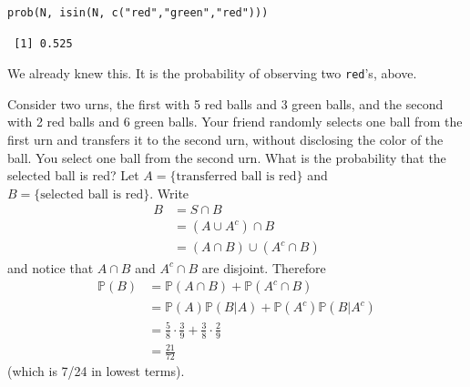 \documentclass[captions=tableheading]{scrbook}
\begin{document}
\lstset{language=R}
\begin{lstlisting}
prob(N, isin(N, c("red","green","red")))
\end{lstlisting}

\begin{verbatim}
 [1] 0.525
\end{verbatim}

We already knew this. It is the probability of observing two \texttt{red}'s, above.

\begin{example}
Consider two urns, the first with 5 red balls and 3 green balls, and the second with 2 red balls and 6 green balls. Your friend randomly selects one ball from the first urn and transfers it to the second urn, without disclosing the color of the ball. You select one ball from the second urn. What is the probability that the selected ball is red? Let \( A = \{ \mbox{transferred ball is red} \} \) and \( B = \{ \mbox{selected ball is red} \} \). Write
\begin{align*}
B & =S\cap B\\
 & =(A\cup A^{c})\cap B\\
 & =(A\cap B)\cup(A^{c}\cap B)
\end{align*}
and notice that \(A\cap B\) and \(A^{c}\cap B\) are disjoint. Therefore
\begin{align*}
\mathbb{P}(B) & =\mathbb{P}(A\cap B)+\mathbb{P}(A^{c}\cap B)\\
 & =\mathbb{P}(A)\mathbb{P}(B|A)+\mathbb{P}(A^{c})\mathbb{P}(B|A^{c})\\
 & =\frac{5}{8}\cdot\frac{3}{9}+\frac{3}{8}\cdot\frac{2}{9}\\
 & =\frac{21}{72}\ 
\end{align*}
(which is 7/24 in lowest terms).

\end{example}
\end{document}
